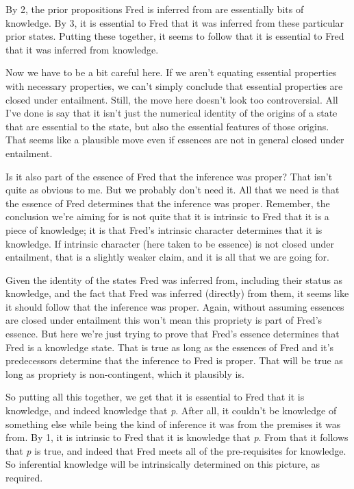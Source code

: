 \documentclass[
  10pt,
  letterpaper,
  DIV=11,
  numbers=noendperiod,
  twoside]{scrartcl}
\begin{document}
By 2, the prior propositions Fred is inferred from are essentially bits
of knowledge. By 3, it is essential to Fred that it was inferred from
these particular prior states. Putting these together, it seems to
follow that it is essential to Fred that it was inferred from knowledge.

Now we have to be a bit careful here. If we aren't equating essential
properties with necessary properties, we can't simply conclude that
essential properties are closed under entailment. Still, the move here
doesn't look too controversial. All I've done is say that it isn't just
the numerical identity of the origins of a state that are essential to
the state, but also the essential features of those origins. That seems
like a plausible move even if essences are not in general closed under
entailment.

Is it also part of the essence of Fred that the inference was proper?
That isn't quite as obvious to me. But we probably don't need it. All
that we need is that the essence of Fred determines that the inference
was proper. Remember, the conclusion we're aiming for is not quite that
it is intrinsic to Fred that it is a piece of knowledge; it is that
Fred's intrinsic character determines that it is knowledge. If intrinsic
character (here taken to be essence) is not closed under entailment,
that is a slightly weaker claim, and it is all that we are going for.

Given the identity of the states Fred was inferred from, including their
status as knowledge, and the fact that Fred was inferred (directly) from
them, it seems like it should follow that the inference was proper.
Again, without assuming essences are closed under entailment this won't
mean this propriety is part of Fred's essence. But here we're just
trying to prove that Fred's essence determines that Fred is a knowledge
state. That is true as long as the essences of Fred and it's
predecessors determine that the inference to Fred is proper. That will
be true as long as propriety is non-contingent, which it plausibly is.

So putting all this together, we get that it is essential to Fred that
it is knowledge, and indeed knowledge that \emph{p}. After all, it
couldn't be knowledge of something else while being the kind of
inference it was from the premises it was from. By 1, it is intrinsic to
Fred that it is knowledge that \emph{p}. From that it follows that
\emph{p} is true, and indeed that Fred meets all of the pre-requisites
for knowledge. So inferential knowledge will be intrinsically determined
on this picture, as required.
\end{document}
